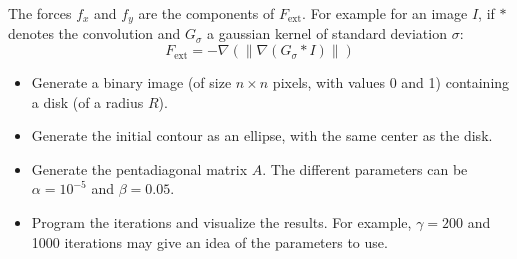 The forces $f_x$ and $f_y$ are the components of $F_{\textrm{ext}}$. 
For example for an image $I$, if $*$ denotes the convolution and 
$G_\sigma$ a gaussian kernel of standard deviation $\sigma$:
$$F_{\textrm{ext}}=-\nabla (\|\nabla(G_\sigma * I)\|)$$

\begin{qbox}
\begin{itemize}\item Generate a binary image (of size $n\times n$ pixels, with values 0 and 1) containing a disk (of a radius $R$).
 \item Generate the initial contour as an ellipse, with the same center as the disk.
 \item Generate the pentadiagonal matrix $A$. The different parameters can be $\alpha=10^{-5}$ and $\beta=0.05$.
 \item Program the iterations and visualize the results. For example, $\gamma=200$ and 1000 iterations may give an idea of the parameters to use.
\end{itemize}
\end{qbox}

